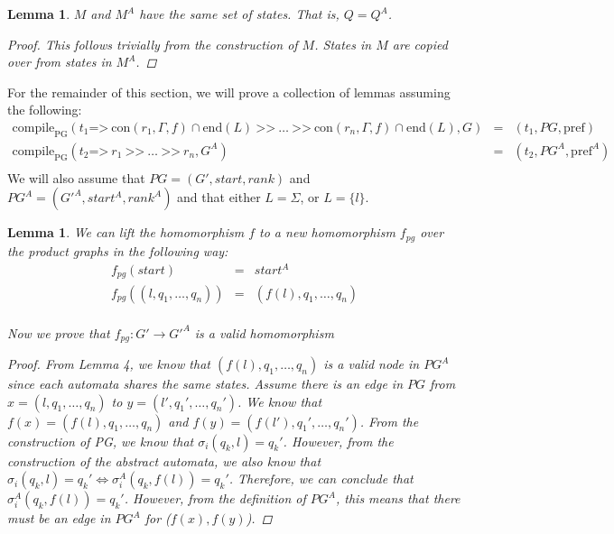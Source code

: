 \documentclass[twocolumn, openany]{sig-alternate-10pt}
\newcommand{\Prefer}{\texttt{>>}}
\newcommand{\Path}{\texttt{=>}}
\newcommand{\Con}{\mathrm{con}}
\newcommand{\CompilePg}{\ensuremath{\mathrm{compile}_\mathrm{PG}}}
\newcommand{\Pref}{\ensuremath{\mathrm{pref}}}
\newcommand{\EndR}{\ensuremath{\mathrm{end}}}
\newtheorem{lem}[thm]{Lemma}
\begin{document}
\vspace{.5em}
\begin{lem} $M$ and $M^A$ have the same set of states. That is, $Q = Q^A$.
    $ $
    \vspace{1em}
    \begin{proof}
      This follows trivially from the construction of $M$. States in $M$ are copied over from states in $M^A$.
    \end{proof}
\end{lem}

\vspace{3em}
For the remainder of this section, we will prove a collection of lemmas assuming the following: 
%
\[
\begin{array}{lll}
  \CompilePg(t_1 \Path~ \Con(r_1,\Gamma,f) \cap \EndR(L) ~\Prefer~ \ldots ~\Prefer~ \Con(r_n,\Gamma,f) \cap \EndR(L), G) &=& (t_1, PG, \Pref) \\
  \CompilePg(t_2 \Path~ r_1 ~\Prefer~ \ldots ~\Prefer~ r_n, G^A) &=& (t_2, PG^A, \Pref^A) \\
\end{array}
\]
%
We will also assume that $PG = (G',start,rank)$ and $PG^A = (G'^A,start^A,rank^A)$ and that either $L = \Sigma$, or $L = \{ l \}$.

\vspace{3em}


\begin{lem}
  We can lift the homomorphism $f$ to a new homomorphism $f_{pg}$ over the product graphs in the following way:
  \[ \begin{array}{rcl}
    f_{pg}( start ) & = & start^A  \\
    f_{pg}( (l,q_1,\ldots,q_n) ) & = & (f(l),q_1,\ldots,q_n) \\
  \end{array} \]

  Now we prove that $f_{pg}: G' \rightarrow G'^A$ is a valid homomorphism
  \begin{proof}
    From Lemma 4, we know that $(f(l),q_1,\ldots,q_n)$ is a valid node in $PG^A$ since each automata
    shares the same states. Assume there is an edge in $PG$ from $x=(l,q_1,\ldots,q_n)$
    to $y=(l',q_1',\ldots,q_n')$. We know that $f(x) = (f(l),q_1,\ldots,q_n)$ and $f(y) = (f(l'),q_1',\ldots,q_n')$.
    From the construction of PG, we know that $\sigma_i(q_k, l) = q_k'$. However, from the construction of the abstract automata, we also know that $\sigma_i(q_k, l) = q_k' \iff \sigma^A_i(q_k, f(l)) = q_k'$. Therefore, we can conclude that $\sigma^A_i(q_k, f(l)) = q_k'$. However, from the definition of $PG^A$, this means that there must be an edge in $PG^A$ for ($f(x),f(y)$).
  \end{proof}
\end{lem}
\end{document}
